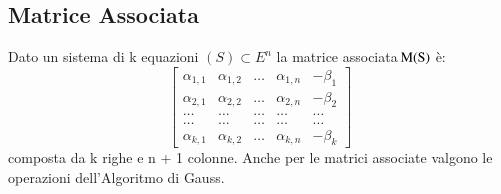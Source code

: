 \documentclass[12pt,a4paper]{article}
\theoremstyle{break}
\begin{document}
    \subsection{Matrice Associata}
    Dato un sistema di k equazioni $(S)\subset E^n$ la matrice associata ${\rm \!M(S)}$ è:
    \[
        \begin{bmatrix}
            \alpha_{1,1} & \alpha_{1,2}  & \dots &  \alpha_{1,n} & -\beta_1 \\
            \alpha_{2,1} & \alpha_{2,2} & \dots & \alpha_{2,n} & -\beta_2 \\
            \dots & \dots & \dots & \dots & \dots \\
            \dots & \dots & \dots & \dots & \dots \\
            \alpha_{k,1} & \alpha_{k,2} & \dots & \alpha_{k,n} & -\beta_k
        \end{bmatrix}
    \]
    composta da k righe e n + 1 colonne. Anche per le matrici associate valgono le operazioni dell'Algoritmo di Gauss.
\end{document}
